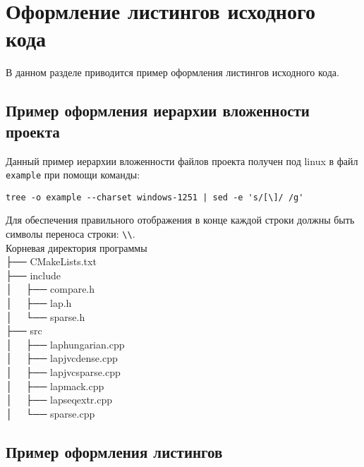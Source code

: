 \newpage\section{Оформление листингов исходного кода}

В данном разделе приводится пример оформления листингов исходного кода.

\subsection{Пример оформления иерархии вложенности проекта}

Данный пример иерархии вложенности файлов проекта получен под linux в файл \lstinline|example| при помощи команды:

\begin{lstlisting}[numbers=none]
tree -o example --charset windows-1251 | sed -e 's/[\]/ /g'
\end{lstlisting}

Для обеспечения правильного отображения в конце каждой строки должны быть символы переноса строки: \lstinline|\\|.\\

{
\listingtextsize\noindent
Корневая директория программы\\
├── CMakeLists.txt\\
├── include\\
│   ├── compare.h\\
│   ├── lap.h\\
│   └── sparse.h\\
├── src\\
│   ├── laphungarian.cpp\\
│   ├── lapjvcdense.cpp\\
│   ├── lapjvcsparse.cpp\\
│   ├── lapmack.cpp\\
│   ├── lapseqextr.cpp\\
│   └── sparse.cpp\\

}

\newpage
\subsection{Пример оформления листингов}

